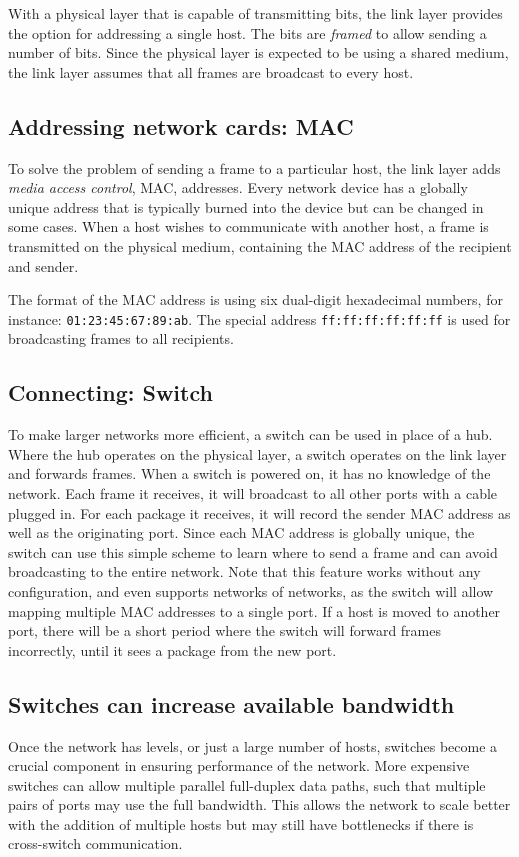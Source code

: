 With a physical layer that is capable of transmitting bits, the link layer provides the option for addressing a single host. The bits are \emph{framed} to allow sending a number of bits. Since the physical layer is expected to be using a shared medium, the link layer assumes that all frames are broadcast to every host.

\subsection{Addressing network cards: MAC}
To solve the problem of sending a frame to a particular host, the link layer adds \emph{media access control}, MAC, addresses. Every network device has a globally unique address that is typically burned into the device but can be changed in some cases. When a host wishes to communicate with another host, a frame is transmitted on the physical medium, containing the MAC address of the recipient and sender.

The format of the MAC address is using six dual-digit hexadecimal numbers, for instance: \texttt{01:23:45:67:89:ab}. The special address \texttt{ff:ff:ff:ff:ff:ff} is used for broadcasting frames to all recipients.

\subsection{Connecting: Switch}
To make larger networks more efficient, a switch can be used in place of a hub. Where the hub operates on the physical layer, a switch operates on the link layer and forwards frames. When a switch is powered on, it has no knowledge of the network. Each frame it receives, it will broadcast to all other ports with a cable plugged in. For each package it receives, it will record the sender MAC address as well as the originating port. Since each MAC address is globally unique, the switch can use this simple scheme to learn where to send a frame and can avoid broadcasting to the entire network. Note that this feature works without any configuration, and even supports networks of networks, as the switch will allow mapping multiple MAC addresses to a single port. If a host is moved to another port, there will be a short period where the switch will forward frames incorrectly, until it sees a package from the new port.

\subsection{Switches can increase available bandwidth}
Once the network has levels, or just a large number of hosts, switches become a crucial component in ensuring performance of the network. More expensive switches can allow multiple parallel full-duplex data paths, such that multiple pairs of ports may use the full bandwidth. This allows the network to scale better with the addition of multiple hosts but may still have bottlenecks if there is cross-switch communication.


